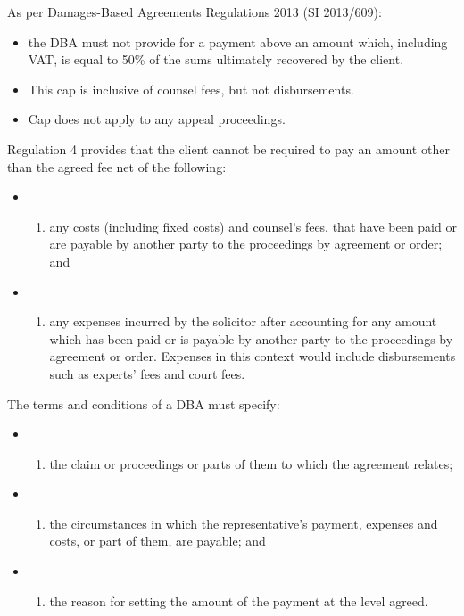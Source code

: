\documentclass[
]{article}
\providecommand{\tightlist}{%
  \setlength{\itemsep}{0pt}\setlength{\parskip}{0pt}}
\begin{document}
As per Damages-Based Agreements Regulations 2013 (SI 2013/609):

\begin{itemize}
\tightlist
\item
  the DBA must not provide for a payment above an amount which,
  including VAT, is equal to 50\% of the sums ultimately recovered by
  the client.
\item
  This cap is inclusive of counsel fees, but not disbursements.
\item
  Cap does not apply to any appeal proceedings.
\end{itemize}

Regulation 4 provides that the client cannot be required to pay an
amount other than the agreed fee net of the following:

\begin{itemize}
\item
  \begin{enumerate}
  \def\labelenumi{(\roman{enumi})}
  \tightlist
  \item
    any costs (including fixed costs) and counsel's fees, that have been
    paid or are payable by another party to the proceedings by agreement
    or order; and
  \end{enumerate}
\item
  \begin{enumerate}
  \def\labelenumi{(\roman{enumi})}
  \setcounter{enumi}{1}
  \tightlist
  \item
    any expenses incurred by the solicitor after accounting for any
    amount which has been paid or is payable by another party to the
    proceedings by agreement or order. Expenses in this context would
    include disbursements such as experts' fees and court fees.
  \end{enumerate}
\end{itemize}

The terms and conditions of a DBA must specify:

\begin{itemize}
\item
  \begin{enumerate}
  \def\labelenumi{(\roman{enumi})}
  \tightlist
  \item
    the claim or proceedings or parts of them to which the agreement
    relates;
  \end{enumerate}
\item
  \begin{enumerate}
  \def\labelenumi{(\roman{enumi})}
  \setcounter{enumi}{1}
  \tightlist
  \item
    the circumstances in which the representative's payment, expenses
    and costs, or part of them, are payable; and
  \end{enumerate}
\item
  \begin{enumerate}
  \def\labelenumi{(\roman{enumi})}
  \setcounter{enumi}{2}
  \tightlist
  \item
    the reason for setting the amount of the payment at the level
    agreed.
  \end{enumerate}
\end{itemize}
\end{document}
